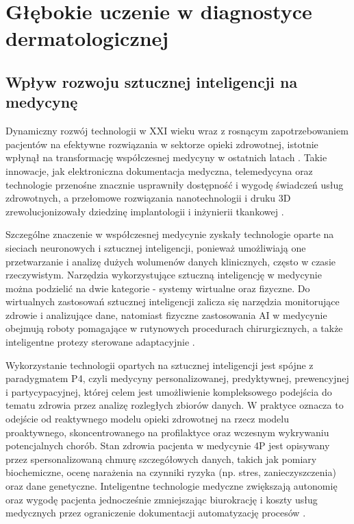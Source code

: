 
\def\filename{rozdzial2}

\chapter{Głębokie uczenie w diagnostyce dermatologicznej}

\section{Wpływ rozwoju sztucznej inteligencji na medycynę}
Dynamiczny rozwój technologii w XXI wieku wraz z rosnącym zapotrzebowaniem pacjentów na efektywne rozwiązania w sektorze opieki zdrowotnej, istotnie wpłynął na transformację współczesnej medycyny w ostatnich latach \cite{CHAPMAN20153}.
Takie innowacje, jak elektroniczna dokumentacja medyczna, telemedycyna oraz technologie przenośne znacznie usprawniły dostępność i wygodę świadczeń usług zdrowotnych, a przełomowe rozwiązania nanotechnologii i druku 3D zrewolucjonizowały dziedzinę implantologii i inżynierii tkankowej \cite{HALEEM202370, mahara_revolutionising_2023, thacharodi_revolutionizing_2024}.

Szczególne znaczenie w współczesnej medycynie zyskały technologie oparte na sieciach neuronowych i sztucznej inteligencji, ponieważ umożliwiają one przetwarzanie i analizę dużych wolumenów danych klinicznych, często w czasie rzeczywistym.
Narzędzia wykorzystujące sztuczną inteligencję w medycynie można podzielić na dwie kategorie - systemy wirtualne oraz fizyczne.
Do wirtualnych zastosowań sztucznej inteligencji zalicza się narzędzia monitorujące zdrowie i analizujące dane, natomiast fizyczne zastosowania AI w medycynie obejmują roboty pomagające w rutynowych procedurach chirurgicznych, a także inteligentne protezy sterowane adaptacyjnie \cite{amisha_overview_2019, sezer_application_2020}.

Wykorzystanie technologii opartych na sztucznej inteligencji jest spójne z paradygmatem P4, czyli medycyny personalizowanej, predyktywnej, prewencyjnej i partycypacyjnej, której celem jest umożliwienie kompleksowego podejścia do tematu zdrowia przez analizę rozległych zbiorów danych.
W praktyce oznacza to odejście od reaktywnego modelu opieki zdrowotnej na rzecz modelu proaktywnego, skoncentrowanego na profilaktyce oraz wczesnym wykrywaniu potencjalnych chorób.
Stan zdrowia pacjenta w medycynie 4P jest opisywany przez spersonalizowaną chmurę szczegółowych danych, takich jak pomiary biochemiczne, ocenę narażenia na czynniki ryzyka (np. stres, zanieczyszczenia) oraz dane genetyczne.
Inteligentne technologie medyczne zwiększają autonomię oraz wygodę pacjenta jednocześnie zmniejszając biurokrację i koszty usług medycznych przez ograniczenie dokumentacji automatyzację procesów \cite{glos_medycyna_2017, alonso_predictive_2019, briganti_artificial_2020}.

